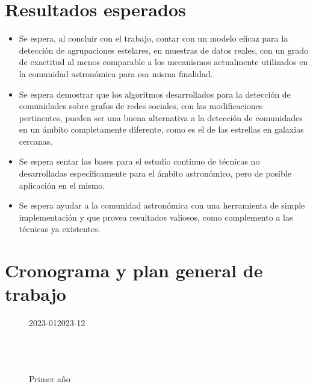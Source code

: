 \documentclass[
	11pt,oneside,a4paper,
	headsepline,footsepline,
	fleqn,
]{memoir}
\begin{document}
\section{Resultados esperados}

\begin{itemize}
	\item Se espera, al concluir con el trabajo, contar con un modelo eficaz para la detección de agrupaciones estelares, en muestras de datos reales, con un grado de exactitud al menos comparable a los mecanismos actualmente utilizados en la comunidad astronómica para esa misma finalidad.
	\item Se espera demostrar que los algoritmos desarrollados para la detección de comunidades sobre grafos de redes sociales, con las modificaciones pertinentes, pueden ser una buena alternativa a la detección de comunidades en un ámbito completamente diferente, como es el de las estrellas en galaxias cercanas.
	\item Se espera sentar las bases para el estudio continuo de técnicas no desarrolladas específicamente para el ámbito astronómico, pero de posible aplicación en el mismo.
	\item Se espera ayudar a la comunidad astronómica con una herramienta de simple implementación y que provea resultados valiosos, como complemento a las técnicas ya existentes.
\end{itemize}

\section {Cronograma y plan general de trabajo}

\begin{figure}[H]
	\begin{ganttchart}[
			title label font=\tiny,
			bar label font=\tiny,
			y unit chart=0.7cm,
			hgrid,
			vgrid,
			x unit=0.8cm,
			bar/.append style={draw=Black, fill=RoyalBlue!75},
			time slot format=isodate-yearmonth,
			time slot unit=month,
			newline shortcut=true,
			bar label node/.append style={align=right}
		]{2023-01}{2023-12}
		 \\
		 \\
		 \\
		\\
	\end{ganttchart}
	\caption*{Primer año}
\end{figure}
\end{document}
